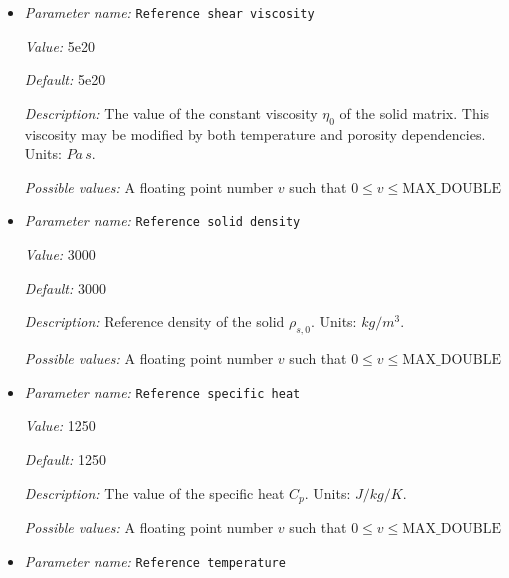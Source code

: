 \begin{itemize}
{\it Default:} 1e-8


{\it Description:} Reference permeability of the solid host rock.Units: $m^2$.


{\it Possible values:} A floating point number $v$ such that $-\text{MAX\_DOUBLE} \leq v \leq \text{MAX\_DOUBLE}$
\item {\it Parameter name:} {\tt Reference shear viscosity}
\label{parameters:Material model/Melt simple/Reference shear viscosity}


{\it Value:} 5e20


{\it Default:} 5e20


{\it Description:} The value of the constant viscosity $\eta_0$ of the solid matrix. This viscosity may be modified by both temperature and porosity dependencies. Units: $Pa \, s$.


{\it Possible values:} A floating point number $v$ such that $0 \leq v \leq \text{MAX\_DOUBLE}$
\item {\it Parameter name:} {\tt Reference solid density}
\label{parameters:Material model/Melt simple/Reference solid density}


{\it Value:} 3000


{\it Default:} 3000


{\it Description:} Reference density of the solid $\rho_{s,0}$. Units: $kg/m^3$.


{\it Possible values:} A floating point number $v$ such that $0 \leq v \leq \text{MAX\_DOUBLE}$
\item {\it Parameter name:} {\tt Reference specific heat}
\label{parameters:Material model/Melt simple/Reference specific heat}


{\it Value:} 1250


{\it Default:} 1250


{\it Description:} The value of the specific heat $C_p$. Units: $J/kg/K$.


{\it Possible values:} A floating point number $v$ such that $0 \leq v \leq \text{MAX\_DOUBLE}$
\item {\it Parameter name:} {\tt Reference temperature}
\label{parameters:Material model/Melt simple/Reference temperature}



\end{itemize}
